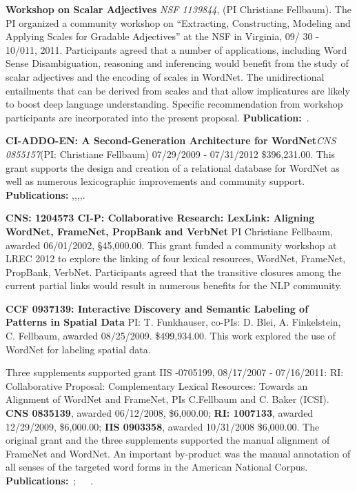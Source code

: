 \documentclass[10pt]{article}
\newcommand{\miniskip}{\vspace*{1mm}}
\begin{document}
\noindent
{\bf Workshop on Scalar Adjectives}
{\it  NSF   1139844}, (PI Christiane Fellbaum).  The PI organized a community workshop on ``Extracting, Constructing, 
Modeling and Applying Scales for Gradable Adjectives'' at the NSF in Virginia, 09/ 30 - 10/011, 2011. Participants agreed that a number of applications, including  
Word Sense Disambiguation,  reasoning and inferencing would benefit 
from the study of scalar adjectives and the encoding of scales in WordNet. The
unidirectional entailments that can be derived from scales and that allow implicatures are
likely to boost deep language understanding. Specific recommendation from workshop participants 
are incorporated into the present proposal. {\bf Publication:}~\cite{sheinmanetal2013}.

\noindent
{\bf CI-ADDO-EN: A Second-Generation Architecture for WordNet}{\it CNS 0855157}(PI: Christiane Fellbaum) 07/29/2009 - 07/31/2012
\$396,231.00. This grant supports the design and creation of a relational database for WordNet as well as numerous lexicographic improvements 
and community support. {\bf Publications:} \cite{fellbaumvossen2012},\cite{fellbaumencyclopedia},\cite{fellbaumontology2010},\cite{chiarcosinpress},\cite{nikolova2012}.

\noindent
{\bf CNS: 1204573 CI-P: Collaborative Research: LexLink: Aligning WordNet, FrameNet, PropBank and VerbNet} PI Christiane Fellbaum, awarded 06/01/2002, 
\S45,000.00. This grant funded a community workshop at LREC 2012 to explore the linking of four lexical resources, WordNet, FrameNet, PropBank, VerbNet. 
Participants agreed that the transitive closures among the current partial links would result in numerous benefits for the NLP community. 

\noindent
{\bf CCF 0937139: Interactive Discovery and Semantic Labeling of Patterns in Spatial Data} PI: T. Funkhauser, co-PIs: D. Blei, A. Finkelstein, C. Fellbaum, awarded 08/25/2009.
\$499,934.00. This work explored the use of WordNet for labeling spatial data. 

\noindent
Three supplements supported grant IIS -0705199, 08/17/2007 - 07/16/2011: RI: Collaborative Proposal: Complementary Lexical Resources: 
Towards an Alignment of WordNet and FrameNet, PIs C.Fellbaum and C. Baker (ICSI). 
{\bf CNS 0835139}, awarded 06/12/2008, \$6,000.00; {\bf RI: 1007133}, awarded 12/29/2009, \$6,000.00; {\bf IIS 0903358}, awarded 10/31/2008 \$6,000.00. 
The original grant and the three supplements supported the manual alignment of FrameNet and WordNet. An important by-product was the manual 
annotation of all senses of the targeted word forms in the American National Corpus. {\bf Publications:}~\cite{fellbaumbakerLRE};~\cite{bakerfellbaum2008}~\cite{bakerfellbaum2009}~\cite{demelo2012}.
\end{document}
